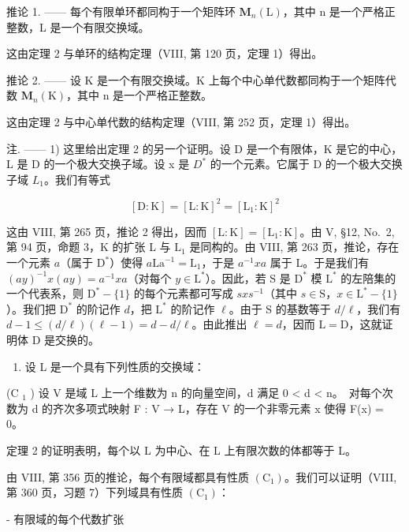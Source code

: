 推论 1. —— 每个有限单环都同构于一个矩阵环 \(\mathbf{M}_{n}(\mathrm{L})\)，其中 n 是一个严格正整数，L 是一个有限交换域。

这由定理 2 与单环的结构定理（VIII, 第 120 页，定理 1）得出。

推论 2. —— 设 K 是一个有限交换域。K 上每个中心单代数都同构于一个矩阵代数 \(\mathbf{M}_{n}(\mathrm{K})\)，其中 n 是一个严格正整数。

这由定理 2 与中心单代数的结构定理（VIII, 第 252 页，定理 1）得出。

注. —— 1) 这里给出定理 2 的另一个证明。设 D 是一个有限体，K 是它的中心，L 是 D 的一个极大交换子域。设 x 是 \(D^{*}\) 的一个元素。它属于 D 的一个极大交换子域 \(L_{1}\)。我们有等式

\[
[ \mathrm{D}: \mathrm{K} ] = [ \mathrm{L}: \mathrm{K} ] ^ {2} = [ \mathrm{L} _ {1}: \mathrm{K} ] ^ {2}
\]

这由 VIII, 第 265 页，推论 2 得出，因而 \([\mathrm{L}:\mathrm{K}] = [\mathrm{L}_1:\mathrm{K}]\)。由 V, §12, No.~2, 第 94 页，命题 3，K 的扩张 L 与 \(\mathrm{L}_1\) 是同构的。由 VIII, 第 263 页，推论，存在一个元素 \(a\)（属于 \(\mathrm{D}^*\)）使得 \(a\mathrm{La}^{-1} = \mathrm{L}_1\)，于是 \(a^{-1}xa\) 属于 L。于是我们有 \((ay)^{-1}x(ay) = a^{-1}xa\)（对每个 \(y\in \mathrm{L}^*\)）。因此，若 S 是 \(\mathrm{D}^*\) 模 \(\mathrm{L}^*\) 的左陪集的一个代表系，则 \(\mathrm{D}^* -\{1\}\) 的每个元素都可写成 \(sxs^{-1}\)（其中 \(s\in \mathrm{S}\)，\(x\in \mathrm{L}^* -\{1\}\)）。我们把 \(\mathrm{D}^*\) 的阶记作 \(d\)，把 \(\mathrm{L}^*\) 的阶记作 \(\ell\)。由于 S 的基数等于 \(d / \ell\)，我们有 \(d - 1\leqslant (d / \ell)(\ell -1) = d - d / \ell\)。由此推出 \(\ell = d\)，因而 \(\mathrm{L} = \mathrm{D}\)，这就证明体 D 是交换的。

\begin{enumerate}
\def\labelenumi{\arabic{enumi})}
\setcounter{enumi}{1}
\tightlist
\item
  设 L 是一个具有下列性质的交换域：
\end{enumerate}

(C \(_{1}\) ) 设 V 是域 L 上一个维数为 n 的向量空间，d 满足 0 \textless{} d \textless{} n。~对每个次数为 d 的齐次多项式映射 F : V → L，存在 V 的一个非零元素 x 使得 F(x) = 0。

定理 2 的证明表明，每个以 L 为中心、在 L 上有限次数的体都等于 L。

由 VIII, 第 356 页的推论，每个有限域都具有性质 \((\mathrm{C}_{1})\)。我们可以证明（VIII, 第 360 页，习题 7）下列域具有性质 \((\mathrm{C}_{1})\)：

- 有限域的每个代数扩张

